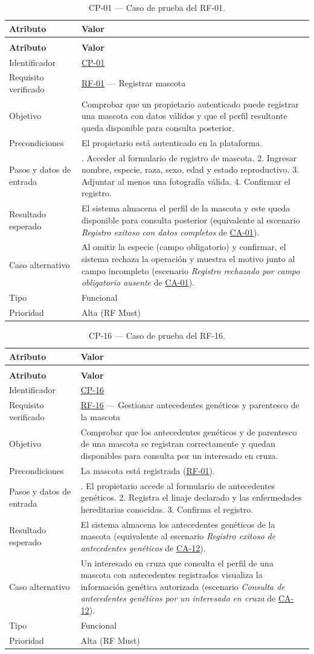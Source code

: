 \documentclass[journal,onecolumn]{IEEEtran}
\makeatletter
\newenvironment{atributos}[2]{%
	\small
	\begin{longtable}{@{}>{\raggedright\arraybackslash}p{4.2cm} >{\raggedright\arraybackslash}p{11.2cm}@{}}
		\caption{#2}\label{tab:#1}\\
		\toprule
		\textbf{Atributo} & \textbf{Valor} \\
		\midrule
		\endfirsthead
		\multicolumn{2}{@{}l}{\small\itshape (continuación)}\\
		\toprule
		\textbf{Atributo} & \textbf{Valor} \\
		\midrule
		\endhead
		\bottomrule
		\endlastfoot
	}{%
	\end{longtable}
	\normalsize
}
\makeatother
\begin{document}
	\begin{atributos}{CP-01}{CP-01 --- Caso de prueba del RF-01.}
		Identificador & \hyperref[tab:CP-01]{CP-01} \\
		Requisito verificado & \hyperref[tab:RF-01]{RF-01} --- Registrar mascota \\
		Objetivo & Comprobar que un propietario autenticado puede registrar una mascota con datos válidos y que el perfil resultante queda disponible para consulta posterior. \\
		Precondiciones & El propietario está autenticado en la plataforma. \\
		Pasos y datos de entrada & 1. Acceder al formulario de registro de mascota. 2. Ingresar nombre, especie, raza, sexo, edad y estado reproductivo. 3. Adjuntar al menos una fotografía válida. 4. Confirmar el registro. \\
		Resultado esperado & El sistema almacena el perfil de la mascota y este queda disponible para consulta posterior (equivalente al escenario \emph{Registro exitoso con datos completos} de \hyperref[lst:ca01]{CA-01}). \\
		Caso alternativo & Al omitir la especie (campo obligatorio) y confirmar, el sistema rechaza la operación y muestra el motivo junto al campo incompleto (escenario \emph{Registro rechazado por campo obligatorio ausente} de \hyperref[lst:ca01]{CA-01}). \\
		Tipo & Funcional \\
		Prioridad & Alta (RF Must) \\
	\end{atributos}

	\begin{atributos}{CP-16}{CP-16 --- Caso de prueba del RF-16.}
		Identificador & \hyperref[tab:CP-16]{CP-16} \\
		Requisito verificado & \hyperref[tab:RF-16]{RF-16} --- Gestionar antecedentes genéticos y parentesco de la mascota \\
		Objetivo & Comprobar que los antecedentes genéticos y de parentesco de una mascota se registran correctamente y quedan disponibles para consulta por un interesado en cruza. \\
		Precondiciones & La mascota está registrada (\hyperref[tab:RF-01]{RF-01}). \\
		Pasos y datos de entrada & 1. El propietario accede al formulario de antecedentes genéticos. 2. Registra el linaje declarado y las enfermedades hereditarias conocidas. 3. Confirma el registro. \\
		Resultado esperado & El sistema almacena los antecedentes genéticos de la mascota (equivalente al escenario \emph{Registro exitoso de antecedentes genéticos} de \hyperref[lst:ca12]{CA-12}). \\
		Caso alternativo & Un interesado en cruza que consulta el perfil de una mascota con antecedentes registrados visualiza la información genética autorizada (escenario \emph{Consulta de antecedentes genéticos por un interesado en cruza} de \hyperref[lst:ca12]{CA-12}). \\
		Tipo & Funcional \\
		Prioridad & Alta (RF Must) \\
	\end{atributos}
\end{document}
